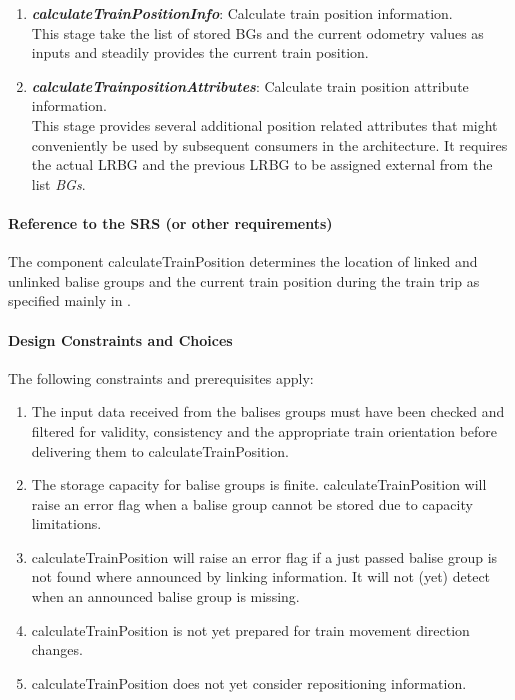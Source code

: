 \begin{enumerate}
\item \textbf{\textit{calculateTrainPositionInfo}}: Calculate train position information.\\
This stage take the list of stored BGs and the current odometry values as inputs and steadily provides the current train position. 

\item \textbf{\textit{calculateTrainpositionAttributes}}: Calculate train position attribute information.\\
This stage provides several additional position related attributes that might conveniently be used by subsequent consumers in the architecture. It requires the actual LRBG and the previous LRBG to be assigned external from the list \textit{BGs}. 
\end{enumerate}

\paragraph{Reference to the SRS (or other requirements)}
The component calculateTrainPosition determines the location of linked and unlinked balise groups and the current train position during the train trip as specified mainly in \cite[Chapter~3.6]{subset-026}.

\paragraph{Design Constraints and Choices}
The following constraints and prerequisites apply:
\begin{enumerate}
\item The input data received from the balises groups must have been checked and filtered for validity, consistency and the appropriate train orientation before delivering them to calculateTrainPosition. 
\item The storage capacity for balise groups is finite. calculateTrainPosition will raise an error flag when a balise group cannot be stored due to capacity limitations.
\item calculateTrainPosition will raise an error flag if a just passed balise group is not found where announced by linking information. It will not (yet) detect when an announced balise group is missing. 
\item calculateTrainPosition is not yet prepared for train movement direction changes. 
\item calculateTrainPosition does not yet consider repositioning information.
\end{enumerate}



